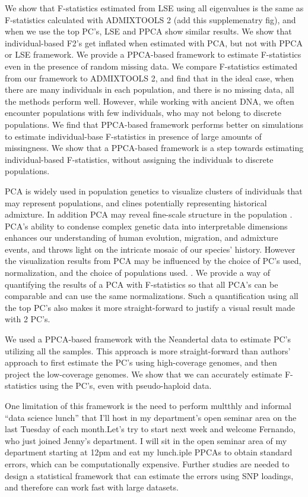 \documentclass[12pt, letterpaper]{article}
\begin{document}
We show that F-statistics estimated from LSE using all eigenvalues is the same as F-statistics calculated with ADMIXTOOLS 2 (add this supplemenatry fig), and when we use the top PC's, LSE and PPCA show similar results. We show that individual-based F2's get inflated when estimated with PCA, but not with PPCA or LSE framework. We provide a PPCA-based framework to estimate F-statistics even in the presence of random missing data. We compare F-statistics estimated from our framework to ADMIXTOOLS 2, and find that in the ideal case, when there are many individuals in each population, and there is no missing data, all the methods perform well. However, while working with ancient DNA, we often encounter populations with few individuals, who may not belong to discrete populations. We find that PPCA-based framework performs better on simulations to estimate individual-base F-statistics in presence of large amounts of missingness. We show that a PPCA-based framework is a step towards estimating individual-based F-statistics, without assigning the individuals to discrete populations.  

PCA is widely used in population genetics to visualize clusters of individuals that may represent populations, and clines potentially representing historical admixture. In addition PCA may reveal fine-scale structure in the population \cite{Ashkenazi Jewish}. PCA's ability to condense complex genetic data into interpretable dimensions enhances our understanding of human evolution, migration, and admixture events, and throws light on the intricate mosaic of our species' history. However the visualization results from PCA may be influenced by the choice of PC's used, normalization, and the choice of populations used. \cite{elhaik_principal_2022}. We provide a way of quantifying the results of a PCA with F-statistics  so that all PCA's can be comparable and can use the same normalizations. Such a quantification using all the top PC's also makes it more straight-forward to justify a visual result made with 2 PC's.

We used a PPCA-based framework with the Neandertal data to estimate PC's utilizing all the samples. This approach is more straight-forward than authors' approach to first estimate the PC's using high-coverage genomes, and then project the low-coverage genomes. We show that we can accurately estimate F-statistics using the PC's, even with pseudo-haploid data.

One limitation of this framework is the need to perform multthly and informal “data science lunch” that I’ll
host in my department’s open seminar area on the last Tuesday of each
month.Let’s try to start next week and welcome Fernando, who just joined
Jenny’s department. I will sit in the open seminar area of my
department starting at 12pm and eat my lunch.iple PPCAs to obtain standard errors, which can be computationally expensive. Further studies are needed to design a statistical framework that can estimate the errors using SNP loadings, and therefore can work fast with large datasets.
\end{document}
